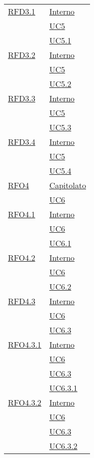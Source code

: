 \begin{longtable}{|>{\centering}m{5cm}|m{5cm}<{\centering}|}
\hyperlink{RFD3.1}{RFD3.1} 
& \hyperlink{Interno}{Interno}\\
& \hyperref[UC5]{UC5}\\
& \hyperref[UC5.1]{UC5.1}\\ \hline

\hyperlink{RFD3.2}{RFD3.2} 
& \hyperlink{Interno}{Interno}\\
& \hyperref[UC5]{UC5}\\
& \hyperref[UC5.2]{UC5.2}\\ \hline

\hyperlink{RFD3.3}{RFD3.3} 
& \hyperlink{Interno}{Interno}\\
& \hyperref[UC5]{UC5}\\
& \hyperref[UC5.3]{UC5.3}\\ \hline

\hyperlink{RFD3.4}{RFD3.4} 
& \hyperlink{Interno}{Interno}\\
& \hyperref[UC5]{UC5}\\
& \hyperref[UC5.4]{UC5.4}\\ \hline

\hyperlink{RFO4}{RFO4} 
& \hyperlink{Capitolato}{Capitolato}\\
& \hyperref[UC6]{UC6}\\ \hline

\hyperlink{RFO4.1}{RFO4.1} 
& \hyperlink{Interno}{Interno}\\
& \hyperref[UC6]{UC6}\\
& \hyperref[UC6.1]{UC6.1}\\ \hline

\hyperlink{RFO4.2}{RFO4.2} 
& \hyperlink{Interno}{Interno}\\
& \hyperref[UC6]{UC6}\\
& \hyperref[UC6.2]{UC6.2}\\ \hline

\hyperlink{RFD4.3}{RFD4.3} 
& \hyperlink{Interno}{Interno}\\
& \hyperref[UC6]{UC6}\\
& \hyperref[UC6.3]{UC6.3}\\ \hline

\hyperlink{RFO4.3.1}{RFO4.3.1} 
& \hyperlink{Interno}{Interno}\\
& \hyperref[UC6]{UC6}\\
& \hyperref[UC6.3]{UC6.3}\\
& \hyperref[UC6.3.1]{UC6.3.1}\\ \hline

\hyperlink{RFO4.3.2}{RFO4.3.2} 
& \hyperlink{Interno}{Interno}\\
& \hyperref[UC6]{UC6}\\
& \hyperref[UC6.3]{UC6.3}\\
& \hyperref[UC6.3.2]{UC6.3.2}\\ \hline


\end{longtable}
